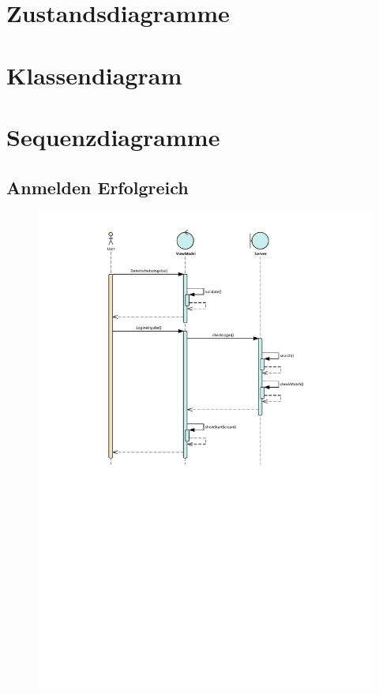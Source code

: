 \documentclass[DIV=13, 10pt,a4paper]{scrartcl}
\begin{document}
\pagebreak

\section{Zustandsdiagramme}

\section{Klassendiagram}

\pagebreak
\section{Sequenzdiagramme}
\subsection*{Anmelden Erfolgreich}
\vfill
\begin{figure}[h!]
	\centering
	\includegraphics[width = 0.8\linewidth]{docs/6_Sequenzdiagramme/Marius/AnmeldenSuccess.pdf}
	\label{fig:SeqDia_Anmelden_Erfolgreich}
\end{figure}

\vfill
\pagebreak
\end{document}
